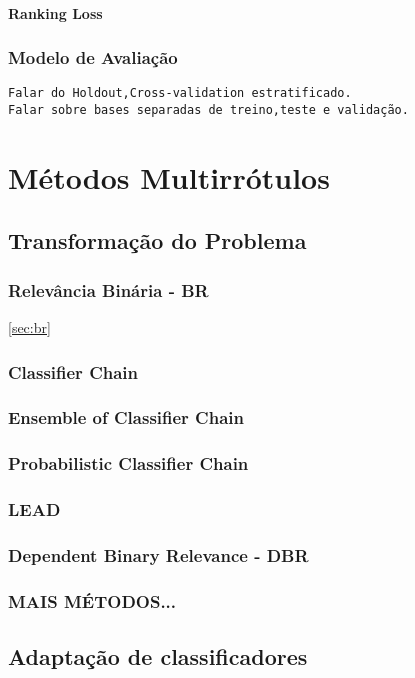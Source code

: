 \subsubsection{Ranking Loss}
\subsection{Modelo de Avaliação}
\label{sec:modelav}

\begin{verbatim}
Falar do Holdout,Cross-validation estratificado.
Falar sobre bases separadas de treino,teste e validação.
\end{verbatim}

\chapter{Métodos Multirrótulos}
\section{Transformação do Problema}
\subsection{Relevância Binária - BR}
\ref{sec:br}
\subsection{Classifier Chain}
\subsection{Ensemble of Classifier Chain}
\subsection{Probabilistic Classifier Chain}
\subsection{LEAD}
\subsection{Dependent Binary Relevance - DBR}
\label{sec:dbr}
\subsection{MAIS MÉTODOS...}

\section{Adaptação de classificadores}
